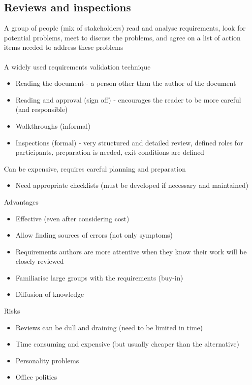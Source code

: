 \documentclass{article}[18pt]
\begin{document}
\subsection{Reviews and inspections}
A group of people (mix of stakeholders) read and analyse requirements, look for potential problems, meet to discuss the problems, and agree on a list of action items needed to address these problems\\
\\
A widely used requirements validation technique
\begin{itemize}
	\item Reading the document - a person other than the author of the document
	\item Reading and approval (sign off) - encourages the reader to be more careful (and responsible)
	\item Walkthroughs (informal)
	\item Inspections (formal) - very structured and detailed review, defined roles for participants, preparation is needed, exit conditions are defined
\end{itemize}
Can be expensive, requires careful planning and preparation
\begin{itemize}
	\item Need appropriate checklists (must be developed if necessary and maintained)
\end{itemize}
Advantages
\begin{itemize}
	\item Effective (even after considering cost)
	\item Allow finding sources of errors (not only symptoms)
	\item Requirements authors are more attentive when they know their work will be closely reviewed
	\item Familiarise large groups with the requirements (buy-in)
	\item Diffusion of knowledge
\end{itemize}
Risks
\begin{itemize}
	\item Reviews can be dull and draining (need to be limited in time)
	\item Time consuming and expensive (but usually cheaper than the alternative)
	\item Personality problems
	\item Office politics
\end{itemize}
\end{document}

